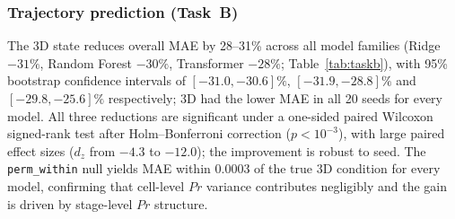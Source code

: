 \documentclass[5p,times,twocolumn]{elsarticle}
\newcommand{\rtag}[1]{}
\newcommand{\rev}[2]{\rtag{#1}#2}
\begin{document}
\subsubsection{\rev{R2.23}{Trajectory prediction (Task~B)}}
\label{sec:res_taskb}

The 3D state reduces overall MAE by 28--31\% across all model
families (Ridge $-31\%$, Random Forest $-30\%$, Transformer
$-28\%$; Table~\ref{tab:taskb})\rev{R1.4}{, with 95\% bootstrap
  confidence intervals of $[-31.0, -30.6]\%$, $[-31.9, -28.8]\%$
  and $[-29.8, -25.6]\%$ respectively; 3D had the lower MAE in all
  20 seeds for every model}.
All three reductions are significant under a one-sided paired
Wilcoxon signed-rank test after Holm--Bonferroni correction
($p < 10^{-3}$), with large paired effect sizes
($d_{z}$ from $-4.3$ to $-12.0$); the improvement is robust to
seed.
The \texttt{perm\_within} null yields MAE within $0.0003$ of the
true 3D condition for every model, confirming that cell-level
$Pr$ variance contributes negligibly and the gain is driven by
stage-level $Pr$ structure.

\begin{table}[!htbp]
  \caption{%
    Task B per-dimension MAE decomposition.
    The overall 3D MAE improvement (Table~\ref{tab:taskb})
    averages an easy-to-predict $Pr$ column into the mean;
    the per-dimension breakdown shows the $P$ and $D$ forecasts
    are statistically unchanged between 2D and 3D.
    $\text{MAE}_{PD}$ averages over the two original dimensions
    only. Mean $\pm$ std across 20 seeds.}
  \label{tab:taskb_perdim}
  \centering
\end{table}
\end{document}
